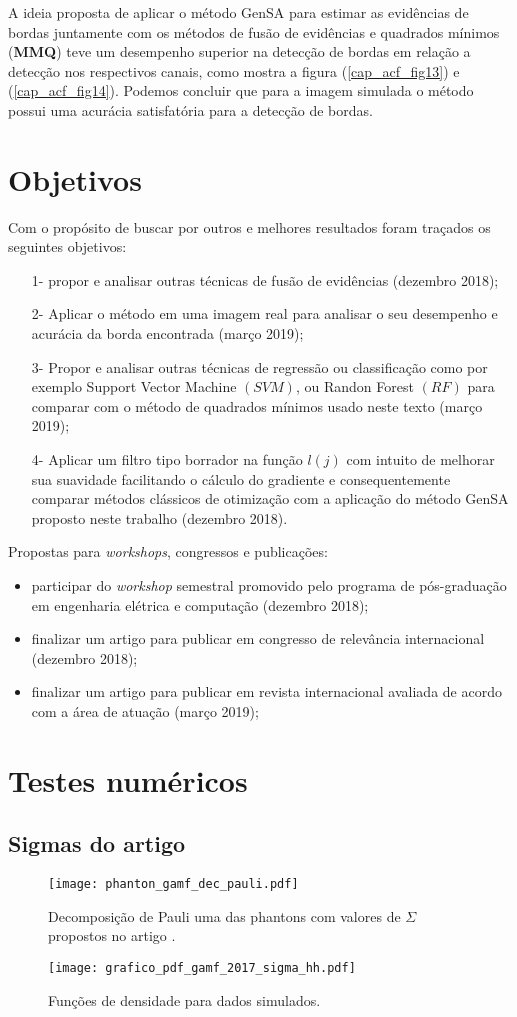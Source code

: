 A ideia proposta de aplicar o método GenSA para estimar as evidências de bordas juntamente com os métodos de fusão de evidências e quadrados  mínimos (\textbf{MMQ}) teve um desempenho superior na detecção de bordas em relação a detecção nos respectivos canais, como mostra a figura (\ref{cap_acf_fig13}) e (\ref{cap_acf_fig14}). Podemos concluir que para a imagem simulada o método possui uma acurácia satisfatória para a detecção de bordas.
\chapter{Objetivos}
Com o propósito de buscar por outros e melhores resultados foram traçados os seguintes objetivos: 
\begin{itemize}
    \item[1-] propor e analisar outras técnicas de fusão de evidências (dezembro   2018); 
	\item[2-] Aplicar o método em uma imagem real para analisar o seu desempenho e acurácia da borda encontrada (março 2019);
	\item[3-] Propor e analisar outras técnicas de regressão ou classificação como por exemplo Support Vector Machine $(SVM)$, ou Randon Forest $(RF)$ para  comparar com o método de quadrados mínimos usado neste texto (março 2019);
	\item[4-] Aplicar um filtro tipo borrador na função $l(j)$ com intuito de melhorar sua suavidade facilitando o cálculo do gradiente e consequentemente comparar métodos clássicos de otimização com a aplicação do método GenSA proposto neste trabalho (dezembro 2018). 
\end{itemize}

Propostas para \textit{workshops}, congressos e publicações:
\begin{itemize}
\item participar do \textit{workshop} semestral promovido pelo programa de pós-graduação em engenharia elétrica e computação (dezembro 2018);
\item finalizar um artigo para publicar em congresso de relevância internacional (dezembro 2018);
\item finalizar um artigo para publicar em revista internacional avaliada de acordo com a área de atuação (março 2019);
\end{itemize}
\chapter{Testes numéricos}
\section{Sigmas do artigo }
\begin{figure}[hbt]
\centering
	\texttt{[image: phanton\_gamf\_dec\_pauli.pdf]}
	\caption{Decomposição de Pauli uma das phantons com valores de $\Sigma$ propostos no artigo \citep{gamf}.}\label{cap_acf_fig01}
\end{figure}
\begin{figure}[hbt]
	\centering
	\texttt{[image: grafico\_pdf\_gamf\_2017\_sigma\_hh.pdf]}
	\caption{Funções de densidade para dados simulados.}\label{cap_acf_fig02}
\end{figure}

